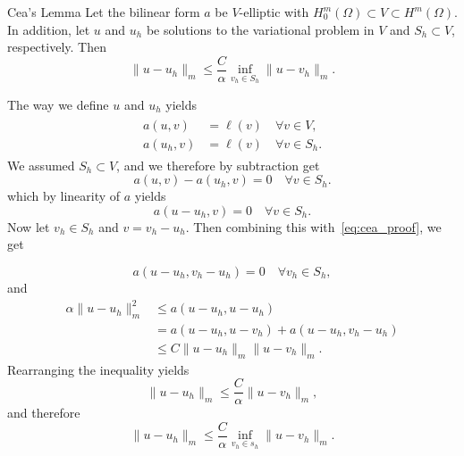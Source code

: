 \begin{lem}{Cea's Lemma}
    Let the bilinear form $a$ be $V$-elliptic with $H_0^m(\Omega)\subset V \subset H^m(\Omega)$. In addition, let $u$ and $u_h$ be solutions to the variational problem in $V$ and $S_h\subset V$, respectively. Then
    \begin{equation}
        \label{eq:cea}
        \|u-u_h\|_m\leq \frac{C}{\alpha}\inf_{v_h\in S_h} \|u-v_h\|_m.
    \end{equation}
    \label{lem:cea}
\end{lem}
\begin{bev}
    The way we define $u$ and $u_h$ yields
    \begin{align}
    \begin{split}
        a(u,v)&= \ell(v) \quad \forall v\in V,\\
        a(u_h,v)&=\ell(v) \quad \forall v\in S_h.
    \end{split}
    \end{align}
    We assumed $S_h\subset V$, and we therefore by subtraction get
    \begin{equation}
        a(u,v)-a(u_h,v)=0 \quad \forall v\in S_h.
    \end{equation}
    which by linearity of $a$ yields
    \begin{equation}
        \label{eq:cea_proof}
        a(u-u_h,v)=0 \quad \forall v\in S_h.
    \end{equation}
    Now let $v_h\in S_h$ and $v=v_h-u_h$. Then combining this with~\eqref{eq:cea_proof}, we get  

    \begin{equation}
        a(u-u_h,v_h-u_h)=0 \quad \forall v_h\in S_h,
    \end{equation}
    and
    \begin{align*}
        \alpha\|u-u_h\|_m^2&\leq a(u-u_h,u-u_h)\\
        &=a(u-u_h,u-v_h)+a(u-u_h,v_h-u_h)\\ 
        &\leq C\|u-u_h\|_m\|u-v_h\|_m.
    \end{align*}
    Rearranging the inequality yields 
    \begin{equation}
        \|u-u_h\|_m\leq \frac{C}{\alpha} \|u-v_h\|_m,
    \end{equation} 
    and therefore
    \begin{equation}
        \|u-u_h\|_m\leq \frac{C}{\alpha}\inf_{v_h\in s_h} \|u-v_h\|_m.
    \end{equation}
\end{bev}